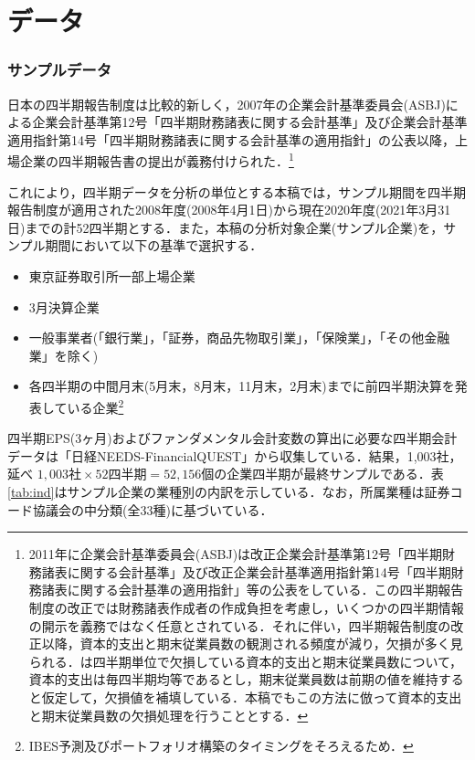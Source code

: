 \documentclass[a4paper，12pt]{jsarticle}
\begin{document}
\part{データ} \label{par:data}

\section{サンプルデータ} \label{sec:sample}

日本の四半期報告制度は比較的新しく，2007年の企業会計基準委員会(ASBJ)による企業会計基準第12号「四半期財務諸表に関する会計基準」及び企業会計基準適用指針第14号「四半期財務諸表に関する会計基準の適用指針」の公表以降，上場企業の四半期報告書の提出が義務付けられた．\footnote{2011年に企業会計基準委員会(ASBJ)は改正企業会計基準第12号「四半期財務諸表に関する会計基準」及び改正企業会計基準適用指針第14号「四半期財務諸表に関する会計基準の適用指針」等の公表をしている．この四半期報告制度の改正では財務諸表作成者の作成負担を考慮し，いくつかの四半期情報の開示を義務ではなく任意とされている．それに伴い，四半期報告制度の改正以降，資本的支出と期末従業員数の観測される頻度が減り，欠損が多く見られる．\cite{zhang2004neural}は四半期単位で欠損している資本的支出と期末従業員数について，資本的支出は毎四半期均等であるとし，期末従業員数は前期の値を維持すると仮定して，欠損値を補填している．本稿でもこの方法に倣って資本的支出と期末従業員数の欠損処理を行うこととする．}

これにより，四半期データを分析の単位とする本稿では，サンプル期間を四半期報告制度が適用された2008年度(2008年4月1日)から現在2020年度(2021年3月31日)までの計52四半期とする．また，本稿の分析対象企業(サンプル企業)を，サンプル期間において以下の基準で選択する．

\begin{itemize}
  \item 東京証券取引所一部上場企業
  \item 3月決算企業
  \item 一般事業者(「銀行業」，「証券，商品先物取引業」，「保険業」，「その他金融業」を除く)
  \item 各四半期の中間月末(5月末，8月末，11月末，2月末)までに前四半期決算を発表している企業\footnote{IBES予測及びポートフォリオ構築のタイミングをそろえるため．}
\end{itemize}

四半期EPS(3ヶ月)およびファンダメンタル会計変数の算出に必要な四半期会計データは「日経NEEDS-FinancialQUEST」から収集している．結果，1,003社，延べ $1,003社 \times 52四半期 = 52,156個$の企業四半期が最終サンプルである．表\ref{tab:ind}はサンプル企業の業種別の内訳を示している．なお，所属業種は証券コード協議会の中分類(全33種)に基づいている．
\end{document}
